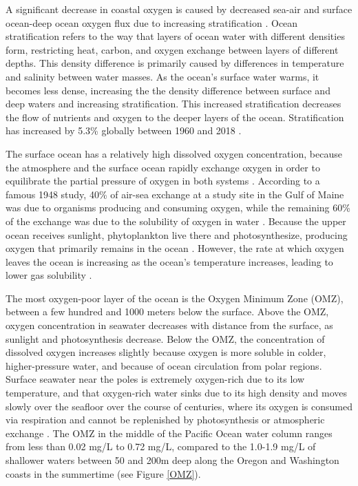\documentclass[12pt,twoside]{reedthesis}
\begin{document}
A significant decrease in coastal oxygen is caused by decreased sea-air and surface ocean-deep ocean oxygen flux due to increasing stratification \autocite{Mancini2024, Portner2022}. Ocean stratification refers to the way that layers of ocean water with different densities form, restricting heat, carbon, and oxygen exchange between layers of different depths. This density difference is primarily caused by differences in temperature and salinity between water masses. As the ocean's surface water warms, it becomes less dense, increasing the the density difference between surface and deep waters and increasing stratification. This increased stratification decreases the flow of nutrients and oxygen to the deeper layers of the ocean. Stratification has increased by 5.3\% globally between 1960 and 2018 \autocite{Li2020a}. 

The surface ocean has a relatively high dissolved oxygen concentration, because the atmosphere and the surface ocean rapidly exchange oxygen in order to equilibrate the partial pressure of oxygen in both systems \autocite{Ito2010}. According to a famous 1948 study, 40\% of air-sea exchange at a study site in the Gulf of Maine was due to organisms producing and consuming oxygen, while the remaining 60\% of the exchange was due to the solubility of oxygen in water \autocite{Redfield1948}. Because the upper ocean receives sunlight, phytoplankton live there and photosynthesize, producing oxygen that primarily remains in the ocean \autocite{Li2020}. However, the rate at which oxygen leaves the ocean is increasing as the ocean's temperature increases, leading to lower gas solubility \autocite{Li2020}. 

The most oxygen-poor layer of the ocean is the Oxygen Minimum Zone (OMZ), between a few hundred and 1000 meters below the surface. Above the OMZ, oxygen concentration in seawater decreases with distance from the surface, as sunlight and photosynthesis decrease. Below the OMZ, the concentration of dissolved oxygen increases slightly because oxygen is more soluble in colder, higher-pressure water, and because of ocean circulation from polar regions. Surface seawater near the poles is extremely oxygen-rich due to its low temperature, and that oxygen-rich water sinks due to its high density and moves slowly over the seafloor over the course of centuries, where its oxygen is consumed via respiration and cannot be replenished by photosynthesis or atmospheric exchange \autocite{Karstensen2008, Deutsch2024, Ito2010}. The OMZ in the middle of the Pacific Ocean water column ranges from less than 0.02 mg/L to 0.72 mg/L, compared to the 1.0-1.9 mg/L of shallower waters between 50 and 200m deep along the Oregon and Washington coasts in the summertime \autocite{Karstensen2008, Deutsch2024, Barth2024, Pierce2012, Wyrtki1962} (see Figure \ref{OMZ}).
\end{document}
